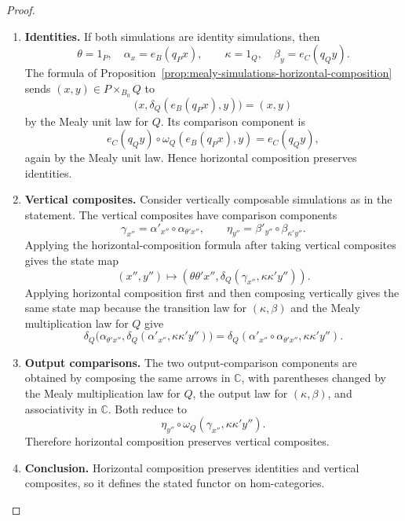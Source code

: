 \begin{proof}
    \leavevmode
    \begin{enumerate}
        \item \textbf{Identities.} If both simulations are identity simulations, then
        \[
            \theta=1_P,
            \quad
            \alpha_x=e_B(q_Px),
            \qquad
            \kappa=1_Q,
            \quad
            \beta_y=e_C(q_Qy).
        \]
        The formula of Proposition~\ref{prop:mealy-simulations-horizontal-composition} sends \((x,y)\in P\times_{B_0}Q\) to
        \[
            \bigl(x,\delta_Q(e_B(q_Px),y)\bigr)=(x,y)
        \]
        by the Mealy unit law for \(Q\). Its comparison component is
        \[
            e_C(q_Qy)\circ\omega_Q(e_B(q_Px),y)=e_C(q_Qy),
        \]
        again by the Mealy unit law. Hence horizontal composition preserves identities.

        \item \textbf{Vertical composites.} Consider vertically composable simulations as in the statement. The vertical composites have comparison components
        \[
            \gamma_{x''}=\alpha'_{x''}\circ\alpha_{\theta' x''},
            \qquad
            \eta_{y''}=\beta'_{y''}\circ\beta_{\kappa' y''}.
        \]
        Applying the horizontal-composition formula after taking vertical composites gives the state map
        \[
            (x'',y'')
            \longmapsto
            \left(
                \theta\theta' x'',
                \delta_Q(\gamma_{x''},\kappa\kappa' y'')
            \right).
        \]
        Applying horizontal composition first and then composing vertically gives the same state map because the transition law for \((\kappa,\beta)\) and the Mealy multiplication law for \(Q\) give
        \[
            \delta_Q\bigl(
                \alpha_{\theta' x''},
                \delta_Q(\alpha'_{x''},\kappa\kappa' y'')
            \bigr)
            =
            \delta_Q(
                \alpha'_{x''}\circ\alpha_{\theta' x''},
                \kappa\kappa' y''
            ).
        \]

        \item \textbf{Output comparisons.} The two output-comparison components are obtained by composing the same arrows in \(\mathbb C\), with parentheses changed by the Mealy multiplication law for \(Q\), the output law for \((\kappa,\beta)\), and associativity in \(\mathbb C\). Both reduce to
        \[
            \eta_{y''}\circ
            \omega_Q(\gamma_{x''},\kappa\kappa' y'').
        \]
        Therefore horizontal composition preserves vertical composites.

        \item \textbf{Conclusion.} Horizontal composition preserves identities and vertical composites, so it defines the stated functor on hom-categories.
    \end{enumerate}
\end{proof}

